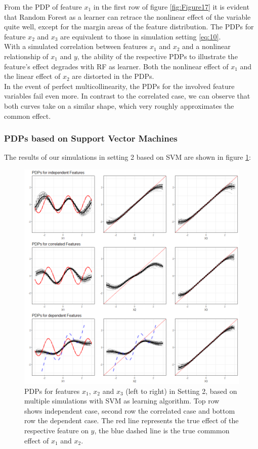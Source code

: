 \documentclass[]{krantz}
\begin{document}
From the PDP of feature \(x_1\) in the first row of figure
\ref{fig:Figure17} it is evident that Random Forest as a learner can
retrace the nonlinear effect of the variable quite well, except for the
margin areas of the feature distribution. The PDPs for feature \(x_2\)
and \(x_3\) are equivalent to those in simulation setting \eqref{eq:10}.\\
With a simulated correlation between features \(x_1\) and \(x_2\) and a
nonlinear relationship of \(x_1\) and \(y\), the ability of the
respective PDPs to illustrate the feature's effect degrades with RF as
learner. Both the nonlinear effect of \(x_1\) and the linear effect of
\(x_2\) are distorted in the PDPs.\\
In the event of perfect multicollinearity, the PDPs for the involved
feature variables fail even more. In contrast to the correlated case, we
can observe that both curves take on a similar shape, which very roughly
approximates the common effect.

\subsubsection{PDPs based on Support Vector
Machines}\label{pdps-based-on-support-vector-machines-1}

The results of our simulations in setting 2 based on SVM are shown in
figure \ref{fig:Figure18}:

\begin{figure}

\includegraphics[width=1\linewidth]{images/VK_PDP_18_Set2_SVM} \hfill{}

\caption{PDPs for features $x_1$, $x_2$ and $x_3$ (left to right) in Setting 2, based on multiple simulations with SVM as learning algorithm. Top row shows independent case, second row the correlated case and bottom row the dependent case. The red line represents the true effect of the respective feature on $y$, the blue dashed line is the true commmon effect of $x_1$ and $x_2$.}\label{fig:Figure18}
\end{figure}
\end{document}
